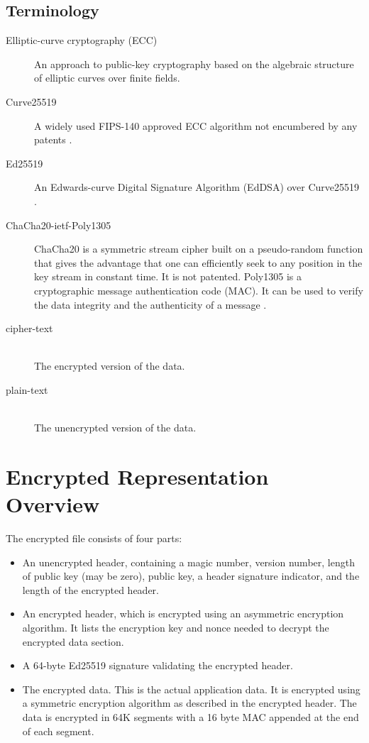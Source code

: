 \documentclass[10pt]{article}
\begin{document}
\subsection{Terminology}
\begin{description}
\item[Elliptic-curve cryptography (ECC)]
An approach to public-key cryptography based on the algebraic structure of elliptic curves over finite fields.
\item[Curve25519]
A widely used FIPS-140 approved ECC algorithm not encumbered by any patents \cite{RFC7748}.
\item[Ed25519]
An Edwards-curve Digital Signature Algorithm (EdDSA) over Curve25519 \cite{RFC8032}.
\item[ChaCha20-ietf-Poly1305]
ChaCha20 is a symmetric stream cipher built on a pseudo-random function that gives the advantage that one can
efficiently seek to any position in the key stream in constant time.
It is not patented.
Poly1305 is a cryptographic message authentication code (MAC).
It can be used to verify the data integrity and the authenticity of a message \cite{RFC8439}.

\item[cipher-text]~\\
The encrypted version of the data.

\item[plain-text]~\\
The unencrypted version of the data.

\end{description}

\section{Encrypted Representation Overview}
The encrypted file consists of four parts:

\begin{itemize}
\item An unencrypted header, containing a magic number, version number, length of public key
(may be zero), public key, a header signature indicator, and the length of the encrypted header.

\item An encrypted header, which is encrypted using an asymmetric encryption algorithm.
It lists the encryption key and nonce needed to decrypt the encrypted data section.

\item A 64-byte Ed25519 signature validating the encrypted header.

\item The encrypted data.
This is the actual application data.
It is encrypted using a symmetric encryption algorithm as described in the encrypted header.
The data is encrypted in 64K segments with a 16 byte MAC appended at the end of each segment.
\end{itemize}
\end{document}
